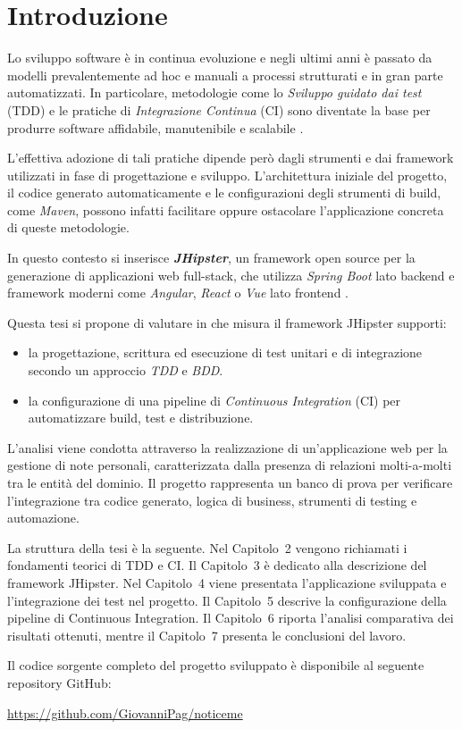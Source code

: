 
\chapter{Introduzione}

Lo sviluppo software è in continua evoluzione e negli ultimi anni è passato da modelli prevalentemente ad hoc e manuali a processi strutturati e in gran parte automatizzati. In particolare, metodologie come lo \textit{Sviluppo guidato dai test} (TDD) e le pratiche di \textit{Integrazione Continua} (CI) sono diventate la base per produrre software affidabile, manutenibile e scalabile \cite{Beck2002,Fowler2006CI}.

L’effettiva adozione di tali pratiche dipende però dagli strumenti e dai framework utilizzati in fase di progettazione e sviluppo. L’architettura iniziale del progetto, il codice generato automaticamente e le configurazioni degli strumenti di build, come \textit{Maven}, possono infatti facilitare oppure ostacolare l’applicazione concreta di queste metodologie.

In questo contesto si inserisce \textit{\textbf{JHipster}}, un framework open source per la generazione di applicazioni web full-stack, che utilizza  \textit{Spring Boot} lato backend e framework moderni come \textit{Angular}, \textit{React} o \textit{Vue} lato frontend \cite{JHipsterDocs}.

Questa tesi si propone di valutare in che misura il framework JHipster supporti:
\begin{itemize}
	\item la progettazione, scrittura ed esecuzione di test unitari e di integrazione secondo un approccio \textit{TDD} e \textit{BDD}.
	\item la configurazione di una pipeline di \textit{Continuous Integration} (CI) per automatizzare build, test e distribuzione.
\end{itemize}

L’analisi viene condotta attraverso la realizzazione di un’applicazione web per la gestione di note personali, caratterizzata dalla presenza di relazioni molti-a-molti tra le entità del dominio. Il progetto rappresenta un banco di prova per verificare l’integrazione tra codice generato, logica di business, strumenti di testing e automazione.

La struttura della tesi è la seguente. Nel Capitolo~2 vengono richiamati i fondamenti teorici di TDD e CI. Il Capitolo~3 è dedicato alla descrizione del framework JHipster. Nel Capitolo~4 viene presentata l'applicazione sviluppata e l'integrazione dei test nel progetto. Il Capitolo~5 descrive la configurazione della pipeline di Continuous Integration. Il Capitolo~6 riporta l’analisi comparativa dei risultati ottenuti, mentre il Capitolo~7 presenta le conclusioni del lavoro.

Il codice sorgente completo del progetto sviluppato è disponibile al seguente repository GitHub:

\url{https://github.com/GiovanniPag/noticeme}